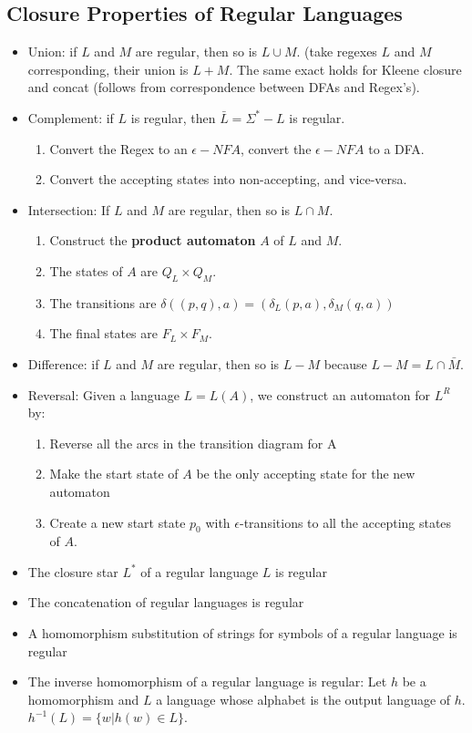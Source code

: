 \subsection{\color{ForestGreen}Closure Properties of Regular Languages}

\begin{itemize}
    \item Union: if $L$ and $M$ are regular, then so is $L\cup M$. (take regexes \( L \) and \( M \) corresponding, their union is \( L+M \). The same exact holds for Kleene closure and concat (follows from correspondence between DFAs and Regex's).
    \item Complement: if $L$ is regular, then $\bar L = \Sigma^* - L$ is regular.
    \begin{enumerate}
        \item Convert the Regex to an $\epsilon-NFA$, convert the $\epsilon-NFA$ to a DFA.
        \item Convert the accepting states into non-accepting, and vice-versa. 
    \end{enumerate}
    \item Intersection: If $L$ and $M$ are regular, then so is $L\cap M$.
    \begin{enumerate}
        \item Construct the \textbf{product automaton} $A$ of $L$ and $M.$
        \item The states of $A$ are $Q_L \times Q_M$. 
        \item The transitions are $\delta ((p, q), a) = (\delta_L(p, a), \delta_M(q, a)) $
        \item The final states are $F_L \times F_M$. 
    \end{enumerate}
    \item Difference: if $L$ and $M$ are regular, then so is $L-M$ because $L-M = L\cap \bar M$.
    \item Reversal: Given a language $L = L(A)$, we construct an automaton for $L^R$ by:
    \begin{enumerate}
        \item Reverse all the arcs in the transition diagram for A
        \item Make the start state of $A$ be the only accepting state for the new automaton
        \item Create a new start state $p_0$ with $\epsilon$-transitions to all the accepting states of $A$.
    \end{enumerate}
    \item The closure star $L^*$ of a regular language $L$ is regular
    \item The concatenation of regular languages is regular
    \item A homomorphism substitution of strings for symbols of a regular language is regular
    \item The inverse homomorphism of a regular language is regular: Let $h$ be a homomorphism and $L$ a language whose alphabet is the output language of $h$. $ h^{-1}(L)= \{w | h(w) \in L\}$.

\end{itemize}
